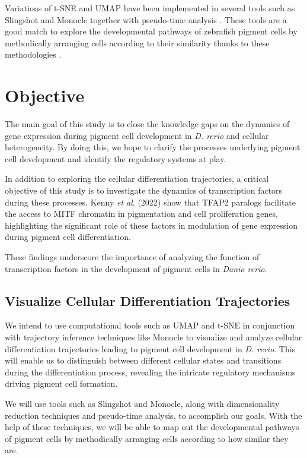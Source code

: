 \documentclass[runningheads]{llncs}
\begin{document}
Variations of t-SNE and UMAP have been implemented in several tools such as Slingshot and Monocle together with pseudo-time analysis \cite{qiu2017reversed,street2018slingshot}. These tools are a good match to explore the developmental pathways of zebrafish pigment cells by methodically arranging cells according to their similarity thanks to these methodologies \cite{nayak2021hitchhiker,kulkarni2019beyond}.

\section{Objective}
The main goal of this study is to close the knowledge gaps on the dynamics of gene expression during pigment cell development in \textit{D. rerio} and cellular heterogeneity. By doing this, we hope to clarify the processes underlying pigment cell development and identify the regulatory systems at play.

In addition to exploring the cellular differentiation trajectories, a critical objective of this study is to investigate the dynamics of transcription factors during these processes. Kenny \textit{et al}. (2022) show that TFAP2 paralogs facilitate the access to MITF chromatin in pigmentation and cell proliferation genes, highlighting the significant role of these factors in modulation of gene expression during pigment cell differentiation. 

These findings underscore the importance of analyzing the function of transcription factors in the development of pigment cells in \textit{Danio rerio}.

\subsection{Visualize Cellular Differentiation Trajectories}
We intend to use computational tools such as UMAP and t-SNE in conjunction with trajectory inference techniques like Monocle \cite{qiu2017reversed} to visualize and analyze cellular differentiation trajectories leading to pigment cell development in \textit{D. rerio}. This will enable us to distinguish between different cellular states and transitions during the differentiation process, revealing the intricate regulatory mechanisms driving pigment cell formation.

We will use tools such as Slingshot \cite{street2018slingshot} and Monocle, along with dimensionality reduction techniques and pseudo-time analysis, to accomplish our goals. With the help of these techniques, we will be able to map out the developmental pathways of pigment cells by methodically arranging cells according to how similar they are. 
\end{document}
